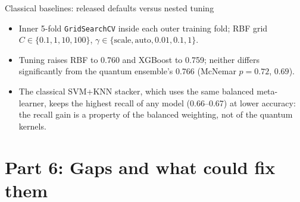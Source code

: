\documentclass[aspectratio=169,10pt,t,xcolor={table}]{beamer}
\newcommand{\tabdir}{../reimplementation/tex/slides/}
\newcommand{\code}[1]{\texttt{\small #1}}
\begin{document}
\begin{frame}{Classical baselines: released defaults versus nested tuning}
\begin{center}

\end{center}
\begin{itemize}\footnotesize
  \item Inner 5-fold \code{GridSearchCV} inside each outer training fold; RBF grid $C\in\{0.1,1,10,100\}$, $\gamma\in\{\text{scale},\text{auto},0.01,0.1,1\}$.
  \item Tuning raises RBF to 0.760 and XGBoost to 0.759; neither differs significantly from the quantum ensemble's 0.766 (McNemar $p=0.72$, $0.69$).
  \item The classical SVM+KNN stacker, which uses the same balanced meta-learner, keeps the highest recall of any model (0.66--0.67) at lower accuracy: the recall gain is a property of the balanced weighting, not of the quantum kernels.
\end{itemize}
\end{frame}

\section{Part 6: Gaps and what could fix them}
\end{document}

